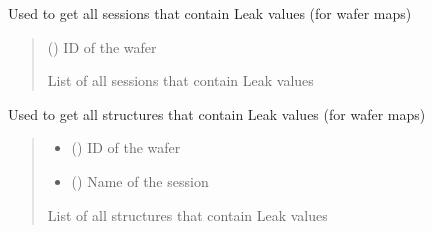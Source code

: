 \documentclass[letterpaper,10pt,english]{sphinxmanual}
\begin{document}

\begin{fulllineitems}
\label{\detokenize{getter:getter.get_Leak_sessions}}
\pysigstartsignatures
{}
\pysigstopsignatures
\sphinxAtStartPar
Used to get all sessions that contain Leak values (for wafer maps)
\begin{quote}\begin{description}
\sphinxAtStartPar
{} () \textendash{} ID of the wafer

\sphinxAtStartPar
List of all sessions that contain Leak values

\end{description}\end{quote}

\end{fulllineitems}


\begin{fulllineitems}
\label{\detokenize{getter:getter.get_Leak_structures}}
\pysigstartsignatures
{}
\pysigstopsignatures
\sphinxAtStartPar
Used to get all structures that contain Leak values (for wafer maps)
\begin{quote}\begin{description}
\begin{itemize}
\item {} 
\sphinxAtStartPar
{} () \textendash{} ID of the wafer

\item {} 
\sphinxAtStartPar
{} () \textendash{} Name of the session

\end{itemize}

\sphinxAtStartPar
List of all structures that contain Leak values

\end{description}\end{quote}

\end{fulllineitems}
\end{document}
